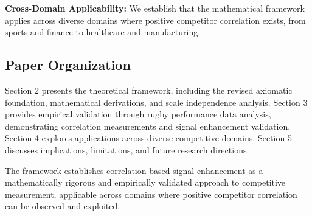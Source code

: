 \textbf{Cross-Domain Applicability:} We establish that the mathematical framework applies across diverse domains where positive competitor correlation exists, from sports and finance to healthcare and manufacturing.

\subsection{Paper Organization}

Section 2 presents the theoretical framework, including the revised axiomatic foundation, mathematical derivations, and scale independence analysis. Section 3 provides empirical validation through rugby performance data analysis, demonstrating correlation measurements and signal enhancement validation. Section 4 explores applications across diverse competitive domains. Section 5 discusses implications, limitations, and future research directions.

The framework establishes correlation-based signal enhancement as a mathematically rigorous and empirically validated approach to competitive measurement, applicable across domains where positive competitor correlation can be observed and exploited.